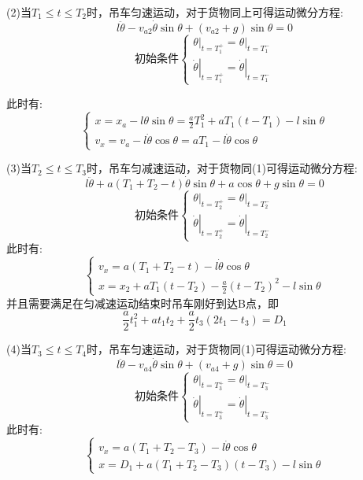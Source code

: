 \documentclass[withoutpreface,bwprint]{cumcmthesis} %
\begin{document}
(2)当$T_1 \leq t \leq T_2$时，吊车匀速运动，对于货物同上可得运动微分方程:
$$l\ddot{\theta}-v_{a2}\dot{\theta}\sin\theta+(v_{a2}+g) \sin \theta=0$$
$$\text{初始条件}\left \{\begin{array}{l}
        \left.\theta\right|_{t=T_{1}^{+}}=\left.\theta\right|_{t=T_{1}^{-}} \\
        \left.\dot{\theta}\right|_{t=T_{1}^{+}}=\left.\dot{\theta}\right|_{t=T_{1}^{-}}
    \end{array}\right.$$

此时有:$$\left\{\begin{array}{l}
        x=x_{a}-l\theta \sin \theta=\frac{a}{2} T_{1}^{2}+aT_1(t-T_1)-l\sin \theta \\
        v_{x}=v_{a}-l \dot{\theta} \cos \theta=a T_{1}-l\dot{\theta }\cos \theta
    \end{array}\right.$$

(3)当$T_2 \leq t \leq T_3$时，吊车匀减速运动，对于货物同(1)可得运动微分方程:
$$l \ddot{\theta}+a\left(T_{1}+T_{2}-t\right) \dot{\theta} \sin \theta+a \cos \theta+g \sin \theta=0$$
$$\text{初始条件}\left \{\begin{array}{l}
        \left.\theta\right|_{t=T_{2}^{+}}=\left.\theta\right|_{t=T_{2}^{-}} \\
        \left.\dot{\theta}\right|_{t=T_{2}^{+}}=\left.\dot{\theta}\right|_{t=T_{2}^{-}}
    \end{array}\right.$$
此时有:$$\left\{\begin{array}{l}
        v_{x}=a\left(T_{1}+T_{2}-t\right)-l \dot{ \theta} \cos \theta \\
        x=x_{2}+aT_{1}(t-T_{2})-\frac{a}{2}(t-T_{2})^{2}-l\sin\theta
    \end{array}\right.$$
并且需要满足在匀减速运动结束时吊车刚好到达B点，即$$\frac{a}{2}t_1^2+at_1t_2+\frac{a}{2}t_3(2t_1-t_3)=D_1$$

(4)当$T_3 \leq t \leq T_4$时，吊车匀速运动，对于货物同(1)可得运动微分方程:
$$l\ddot{\theta}-v_{a4}\dot{\theta}\sin\theta+(v_{a4}+g) \sin \theta=0$$
$$\text{初始条件}\left \{\begin{array}{l}
        \left.\theta\right|_{t=T_{3}^{+}}=\left.\theta\right|_{t=T_{3}^{-}} \\
        \left.\dot{\theta}\right|_{t=T_{3}^{+}}=\left.\dot{\theta}\right|_{t=T_{3}^{-}}
    \end{array}\right.$$
此时有:$$\left\{\begin{array}{l}
        v_{x}=a\left(T_1+T_{2}-T_{3}\right)-l \dot{\theta} \cos \theta \\
        x=D_1+a\left(T_{1}+T_{2}-T_{3}\right)\left(t-T_{3}\right)-l \sin \theta
    \end{array}\right.$$
\end{document}
